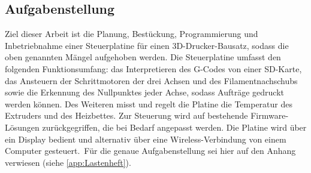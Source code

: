 \subsection{Aufgabenstellung}
\label{sec:Aufgabenstellung}

Ziel dieser Arbeit ist die Planung, Bestückung, Programmierung und Inbetriebnahme einer Steuerplatine für einen 3D-Drucker-Bausatz, sodass die oben genannten Mängel aufgehoben werden. Die Steuerplatine umfasst den folgenden Funktionsumfang: das Interpretieren des G-Codes von einer SD-Karte, das Ansteuern der Schrittmotoren der drei Achsen und des Filamentnachschubs sowie die Erkennung des Nullpunktes jeder Achse, sodass Aufträge gedruckt werden können. Des Weiteren misst und regelt die Platine die Temperatur des Extruders und des Heizbettes. Zur Steuerung wird auf bestehende Firmware-Lösungen zurückgegriffen, die bei Bedarf angepasst werden. Die Platine wird über ein Display bedient und alternativ über eine Wireless-Verbindung von einem Computer gesteuert.\
Für die genaue Aufgabenstellung sei hier auf den Anhang verwiesen (siehe \ref{app:Lastenheft}).
